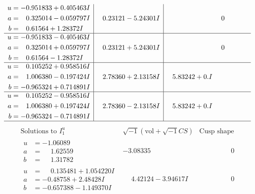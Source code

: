 \documentclass[1p]{elsarticle_modified}
\theoremstyle{definition}
\newcommand{\I}{\sqrt{-1}}
\begin{document}
$$\begin{array}{c|c|c}
\begin{aligned}
u &= -0.951833 + 0.405463 I \\
a &= \phantom{-}0.325014 - 0.059797 I \\
b &= \phantom{-}0.61564 + 1.28372 I\end{aligned}
 & \phantom{-}0.23121 - 5.24301 I & \phantom{-0.000000 } 0 \\ \hline\begin{aligned}
u &= -0.951833 - 0.405463 I \\
a &= \phantom{-}0.325014 + 0.059797 I \\
b &= \phantom{-}0.61564 - 1.28372 I\end{aligned}
 & \phantom{-}0.23121 + 5.24301 I & \phantom{-0.000000 } 0 \\ \hline\begin{aligned}
u &= \phantom{-}0.105252 + 0.958516 I \\
a &= \phantom{-}1.006380 - 0.197424 I \\
b &= -0.965324 + 0.714891 I\end{aligned}
 & \phantom{-}2.78360 + 2.13158 I & \phantom{-}5.83242 + 0. I\phantom{ +0.000000I} \\ \hline\begin{aligned}
u &= \phantom{-}0.105252 - 0.958516 I \\
a &= \phantom{-}1.006380 + 0.197424 I \\
b &= -0.965324 - 0.714891 I\end{aligned}
 & \phantom{-}2.78360 - 2.13158 I & \phantom{-}5.83242 + 0. I\phantom{ +0.000000I}\\
 \hline 
 \end{array}$$\newpage$$\begin{array}{c|c|c}  
\text{Solutions to }I^u_{1}& \I (\text{vol} + \sqrt{-1}CS) & \text{Cusp shape}\\
 \hline 
\begin{aligned}
u &= -1.06089\phantom{ +0.000000I} \\
a &= \phantom{-}1.62559\phantom{ +0.000000I} \\
b &= \phantom{-}1.31782\phantom{ +0.000000I}\end{aligned}
 & -3.08335\phantom{ +0.000000I} & \phantom{-0.000000 } 0 \\ \hline\begin{aligned}
u &= \phantom{-}0.135481 + 1.054220 I \\
a &= -0.48758 + 2.48428 I \\
b &= -0.657388 - 1.149370 I\end{aligned}
 & \phantom{-}4.42124 - 3.94617 I & \phantom{-0.000000 } 0 \\ \hline\begin{aligned}

\end{aligned}
\end{array}$$
\end{document}
